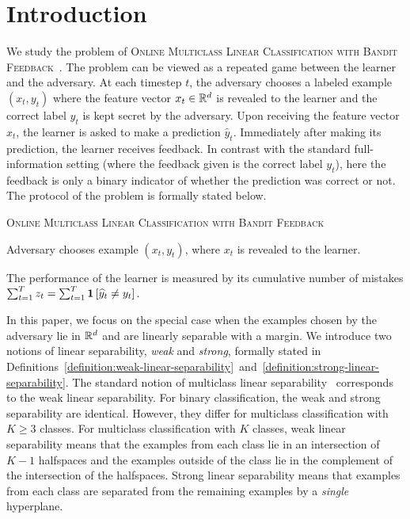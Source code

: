 \section{Introduction}
\label{section:introduction}

We study the problem of \textsc{Online Multiclass Linear Classification with
Bandit Feedback}~\citep{Kakade-Shalev-Shwartz-Tewari-2008}. The problem can be
viewed as a repeated game between the learner and the adversary. At each
timestep $t$, the adversary chooses a labeled example $(x_t, y_t)$ where the
feature vector $x_t \in \mathbb{R}^d$ is revealed to the learner and the correct label
$y_t$ is kept secret by the adversary. Upon receiving the feature vector $x_t$,
the learner is asked to make a prediction $\widehat{y}_t$. Immediately after
making its prediction, the learner receives feedback. In contrast with the
standard full-information setting (where the feedback given is the correct label
$y_t$), here the feedback is only a binary indicator of whether the prediction
was correct or not. The protocol of the problem is formally stated below.

\begin{protocol}[h]
\caption{\textsc{Online Multiclass Linear Classification with Bandit Feedback}
\label{algorithm:game-protocol}}
\begin{algorithmic}[1]
{
\STATE Adversary chooses example $(x_t, y_t)$, where $x_t$ is revealed to the learner.
\ENDFOR
}
\end{algorithmic}
\end{protocol}

The performance of the learner is measured by its cumulative number of
mistakes $\sum_{t=1}^T z_t = \sum_{t=1}^T \mathbf{1}\left[\widehat y_t \neq y_t \right]$.

In this paper, we focus on the special case when the examples chosen by the
adversary lie in $\mathbb{R}^d$ and are linearly separable with a margin. We introduce
two notions of linear separability, \emph{weak} and \emph{strong}, formally
stated in
Definitions~\ref{definition:weak-linear-separability}~and~\ref{definition:strong-linear-separability}.
The standard notion of multiclass linear
separability~\citep{Crammer-Singer-2003} corresponds to the weak linear
separability. For binary classification, the weak and strong separability are
identical. However, they differ for multiclass classification with $K \ge 3$
classes. For multiclass classification with $K$ classes, weak linear
separability means that the examples from each class lie in an intersection of
$K-1$ halfspaces and the examples outside of the class lie in the complement of
the intersection of the halfspaces. Strong linear separability means that
examples from each class are separated from the remaining examples by a
\emph{single} hyperplane.

